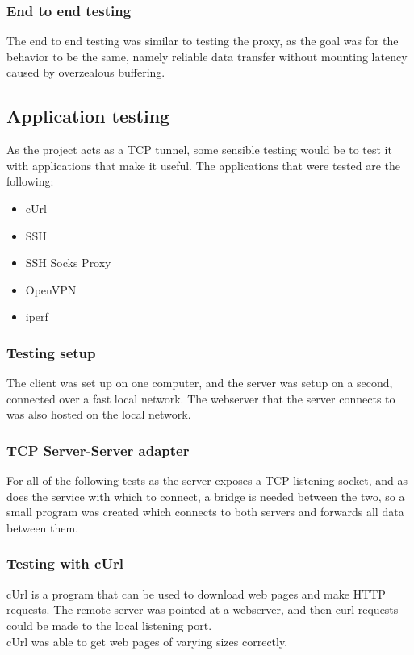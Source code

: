 \subsubsection{End to end testing}
The end to end testing was similar to testing the proxy, as the goal was for the behavior to be the same, namely reliable data transfer without mounting latency caused by overzealous buffering.

\subsection{Application testing}
As the project acts as a TCP tunnel, some sensible testing would be to test it with applications that make it useful.
The applications that were tested are the following:
\begin{itemize}
    \item cUrl
    \item SSH
    \item SSH Socks Proxy
    \item OpenVPN
    \item iperf
\end{itemize}

\subsubsection{Testing setup}
The client was set up on one computer, and the server was setup on a second, connected over a fast local network.
The webserver that the server connects to was also hosted on the local network.

\subsubsection{TCP Server-Server adapter}
For all of the following tests as the server exposes a TCP listening socket, and as does the service with which to connect, a bridge is needed between the two, so a small program was created which connects to both servers and forwards all data between them.

\subsubsection{Testing with cUrl}
cUrl is a program that can be used to download web pages and make HTTP requests.
The remote server was pointed at a webserver, and then curl requests could be made to the local listening port.\\
cUrl was able to get web pages of varying sizes correctly.

